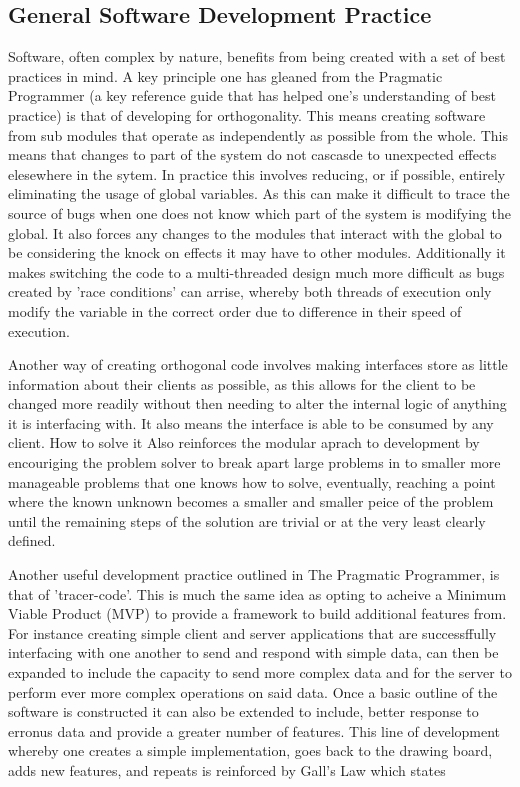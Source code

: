   \subsection{General Software Development Practice}
    Software, often complex by nature, benefits from being created with a set of best practices in mind. A key principle one has gleaned from the Pragmatic Programmer \citep{hunt2000pragmatic} (a key reference guide that has helped one's understanding of best practice) is that of developing for orthogonality. This means creating software from sub modules that operate as independently as possible from the whole. This means that changes to part of the system do not cascasde to unexpected effects elesewhere in the sytem. In practice this involves reducing, or if possible, entirely eliminating the usage of global variables. As this can make it difficult to trace the source of bugs when one does not know which part of the system is modifying the global. It also forces any changes to the modules that interact with the global to be considering the knock on effects it may have to other modules. Additionally it makes switching the code to a multi-threaded design much more difficult as bugs created by 'race conditions' can arrise, whereby both threads of execution only modify the variable in the correct order due to difference in their speed of execution.
    \par
    Another way of creating orthogonal code involves making interfaces store as little information about their clients as possible, as this allows for the client to be changed more readily without then needing to alter the internal logic of anything it is interfacing with. It also means the interface is able to be consumed by any client. How to solve it \citep{G.Polya1945} Also reinforces the modular aprach to development by encouriging the problem solver to break apart large problems in to smaller more manageable problems that one knows how to solve, eventually, reaching a point where the known unknown becomes a smaller and smaller peice of the problem until the remaining steps of the solution are trivial or at the very least clearly defined.
    \par
    Another useful development practice outlined in The Pragmatic Programmer, is that of 'tracer-code'. This is much the same idea as opting to acheive a Minimum Viable Product (MVP) to provide a framework to build additional features from. For instance creating simple client and server applications that are successffully interfacing with one another to send and respond with simple data, can then be expanded to include the capacity to send more complex data and for the server to perform ever more complex operations on said data. Once a basic outline of the software is constructed it can also be extended to include, better response to erronus data and provide a greater number of features. This line of development whereby one creates a simple implementation, goes back to the drawing board, adds new features, and repeats is reinforced by Gall's Law which states  \citep{Gall1977}
